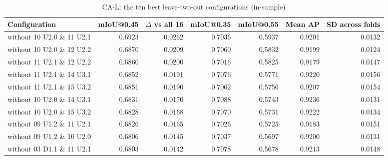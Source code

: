 \begin{table}[H]\centering\scriptsize\setlength{\tabcolsep}{3pt}
\begin{tabular}{>{\raggedright\arraybackslash}p{3.73cm}rrrrrr}
\toprule
Configuration & mIoU@0.45 & $\Delta$ vs all 16 & mIoU@0.35 & mIoU@0.55 & Mean AP & SD across folds \\
\midrule
without 10 U2.0 \& 11 U2.1 & 0.6923 & 0.0262 & 0.7036 & 0.5937 & 0.9201 & 0.0132 \\
without 10 U2.0 \& 12 U2.2 & 0.6870 & 0.0209 & 0.7060 & 0.5832 & 0.9199 & 0.0124 \\
without 11 U2.1 \& 12 U2.2 & 0.6860 & 0.0200 & 0.7016 & 0.5825 & 0.9179 & 0.0147 \\
without 11 U2.1 \& 14 U3.1 & 0.6852 & 0.0191 & 0.7076 & 0.5771 & 0.9220 & 0.0156 \\
without 11 U2.1 \& 15 U3.2 & 0.6851 & 0.0190 & 0.7062 & 0.5756 & 0.9207 & 0.0154 \\
without 10 U2.0 \& 14 U3.1 & 0.6831 & 0.0170 & 0.7088 & 0.5743 & 0.9236 & 0.0131 \\
without 10 U2.0 \& 15 U3.2 & 0.6828 & 0.0168 & 0.7070 & 0.5731 & 0.9222 & 0.0134 \\
without 09 U1.2 \& 11 U2.1 & 0.6826 & 0.0165 & 0.7026 & 0.5725 & 0.9183 & 0.0151 \\
without 09 U1.2 \& 10 U2.0 & 0.6806 & 0.0145 & 0.7037 & 0.5697 & 0.9200 & 0.0131 \\
without 03 D1.1 \& 11 U2.1 & 0.6803 & 0.0142 & 0.7078 & 0.5678 & 0.9213 & 0.0148 \\
\bottomrule
\end{tabular}
\caption{CA-L: the ten best leave-two-out configurations (in-sample)}\label{tab:a1_ca_l_leave2}
\end{table}

